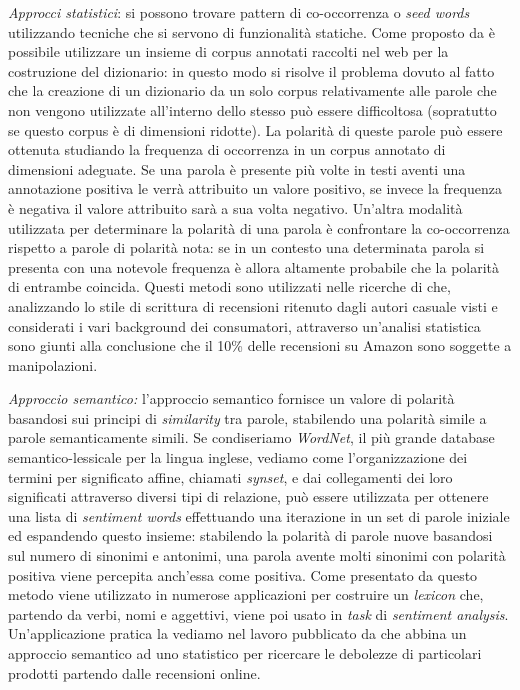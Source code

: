 \documentclass[a4paper,12pt,openright,twoside]{report}
\theoremstyle{definition}
\begin{document}
\emph{Approcci statistici}: si possono trovare pattern di co-occorrenza o \emph{seed words}
utilizzando tecniche che si servono di funzionalità statiche.
Come proposto da \cite{Fahrni2008}
è possibile utilizzare un insieme di corpus annotati raccolti nel web per la costruzione
del dizionario: in questo modo si risolve il problema dovuto al fatto che la creazione di un dizionario
da un solo corpus relativamente alle parole che non vengono utilizzate
all'interno dello stesso può essere difficoltosa (sopratutto se questo corpus è di dimensioni ridotte).
La polarità di queste parole può essere ottenuta studiando la frequenza di occorrenza in 
un corpus annotato di dimensioni adeguate. Se una parola è presente più volte in testi aventi una annotazione
positiva le verrà attribuito un valore positivo, se invece la frequenza è negativa il valore
attribuito sarà a sua volta negativo. Un'altra modalità utilizzata per determinare la polarità di una parola
è confrontare la co-occorrenza rispetto a parole di polarità nota:
se in un contesto una determinata parola si presenta con 
una notevole frequenza è allora altamente probabile che la polarità di entrambe coincida. 
Questi metodi sono utilizzati nelle ricerche di \cite{Hu2012}
che, analizzando lo stile di scrittura di recensioni ritenuto dagli autori casuale visti e considerati 
i vari background dei consumatori, attraverso un'analisi statistica sono giunti alla conclusione
che il 10\% delle recensioni su Amazon sono soggette a manipolazioni.

\emph{Approccio semantico:} l'approccio semantico fornisce un valore di polarità basandosi sui principi
di \emph{similarity} tra parole, stabilendo una polarità simile a parole semanticamente simili.
Se condiseriamo \emph{WordNet}, il più grande database semantico-lessicale per la lingua inglese,
vediamo come l'organizzazione dei termini per significato affine, chiamati \emph{synset}, e dai collegamenti
dei loro significati attraverso diversi tipi di relazione, può essere utilizzata per ottenere una lista di \emph{sentiment words} effettuando una 
iterazione in un set di parole iniziale ed espandendo questo insieme: stabilendo la polarità di parole
nuove basandosi sul numero di sinonimi e antonimi, una parola avente molti sinonimi
con polarità positiva viene percepita anch'essa come positiva.
Come presentato da \cite{Maks2012}
questo metodo viene utilizzato in numerose applicazioni per costruire un \emph{lexicon} che, partendo da verbi,
nomi e aggettivi, viene poi usato in \emph{task} di \emph{sentiment analysis}. Un'applicazione pratica la vediamo nel lavoro
pubblicato da \cite{Qui2010}
che abbina un approccio semantico ad uno statistico per ricercare le debolezze di particolari prodotti
partendo dalle recensioni online.
\end{document}
